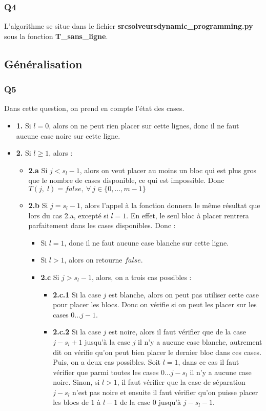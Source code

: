 \documentclass[a4paper]{memoir}
\begin{document}
	\subsubsection{Q4}
	L'algorithme se situe dans le fichier \textbf{src\/solveurs\/dynamic\_programming.py} sous la fonction \textbf{T\_sans\_ligne}.

\subsection{Généralisation}
\subsubsection{Q5}
Dans cette question, on prend en compte l'état des cases.
\begin{itemize}
\item \textbf{1.} Si $l = 0$, alors on ne peut rien placer sur cette lignes, donc il ne faut aucune case noire sur cette ligne.
\item \textbf{2.} Si $l \geq 1$, alors :
    \begin{itemize}
        \item \textbf{2.a} Si $j < s_l - 1$, alors on veut placer au moins un bloc qui est plus gros que le nombre de cases disponible, ce qui est impossible. Donc $T(j,\; l) = false,\ \forall\ j \in \{0, \ldots, m - 1\}$  
        \item \textbf{2.b} Si $j = s_l - 1$, alors l'appel à la fonction donnera le même résultat que lors du cas 2.a, excepté si $l = 1$. En effet, le seul bloc à placer rentrera parfaitement dans les cases disponibles. Donc :
        \begin{itemize}
            \item Si $l = 1$, donc il ne faut aucune case blanche sur cette ligne.
            \item Si $l > 1$, alors on retourne $false$.
        \item \textbf{2.c} Si $j > s_l - 1$, alors, on a trois cas possibles :
            \begin{itemize}
                \item \textbf{2.c.1} Si la case $j$ est blanche, alors on peut pas utiliser cette case pour placer les blocs. Donc on vérifie si on peut les placer sur les cases $0 \ldots j-1$.
                \item \textbf{2.c.2} Si la case $j$ est noire, alors il faut vérifier que de la case $j - s_l + 1$ jusqu'à la case $j$ il n'y a aucune case blanche, autrement dit on vérifie qu'on peut bien placer le dernier bloc dans ces cases. Puis, on a deux cas possibles. Soit $l = 1$, dans ce cas il faut vérifier que parmi toutes les cases $0 \ldots j - s_l$ il n'y a aucune case noire. Sinon, si $l > 1$, il faut vérifier que la case de séparation $j - s_l$ n'est pas noire et ensuite il faut vérifier qu'on puisse placer les blocs de $1$ à $l - 1$ de la case $0$ jusqu'à $j - s_l - 1$.

\end{itemize}
\end{itemize}
\end{itemize}
\end{itemize}
\end{document}
